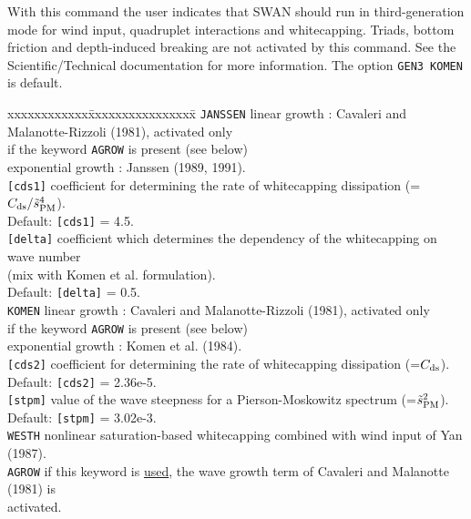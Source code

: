 \documentclass[12pt]{book}
\begin{document}
\noindent
With this command the user indicates that SWAN should run in third-generation mode for wind input, quadruplet interactions and whitecapping.
Triads, bottom friction and depth-induced breaking are not activated by this command. See the Scientific/Technical documentation for more information.
The option {\tt GEN3 KOMEN} is default.
\begin{tabbing}
xxxxxxxxxxxx\=xxxxxxxxxxxxxxxx\= \kill
{\tt JANSSEN} \> linear growth      \>: Cavaleri and Malanotte-Rizzoli (1981), activated only\+\+\\
                                        if the keyword {\tt AGROW} is present (see below)\-\\
                 exponential growth \>: Janssen (1989, 1991).\-\\
{\tt [cds1]}  \> coefficient for determining the rate of whitecapping dissipation (=$C_{\rm ds}/\tilde{s}^4_{\rm PM}$).\+\\
                 Default: {\tt [cds1]} = 4.5.\-\\
{\tt [delta]} \> coefficient which determines the dependency of the whitecapping on wave number\+\\
                 (mix with Komen et al. formulation).\\
                 Default: {\tt [delta]} = 0.5.\-\\
{\tt KOMEN}   \> linear growth      \>: Cavaleri and Malanotte-Rizzoli (1981), activated only\+\+\\
                                        if the keyword {\tt AGROW} is present (see below)\-\\
                 exponential growth \>: Komen et al. (1984).\-\\
{\tt [cds2]}  \> coefficient for determining the rate of whitecapping dissipation (=$C_{\rm ds}$).\+\\
                 Default: {\tt [cds2]} = 2.36e-5.\-\\
{\tt [stpm]}  \> value of the wave steepness for a Pierson-Moskowitz spectrum (=$\tilde{s}^2_{\rm PM}$).\+\\
                 Default: {\tt [stpm]} = 3.02e-3.\-\\
{\tt WESTH}   \> nonlinear saturation-based whitecapping combined with wind input of Yan (1987).\\
{\tt AGROW}   \> if this keyword is \underline{used}, the wave growth term of Cavaleri and Malanotte (1981) is\+\\
                 activated.\\

\end{tabbing}
\end{document}
